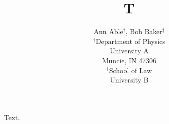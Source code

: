 \documentclass{article}
\title{T}
\author{Ann Able$^{\dagger}$, Bob Baker$^{\ddagger}$ \\ $^\dagger$Department of Physics \\ University A \\ Muncie, IN 47306 \\ $^\ddagger$School of Law \\ University B}
\begin{document}
\maketitle
Text.
\end{document}
